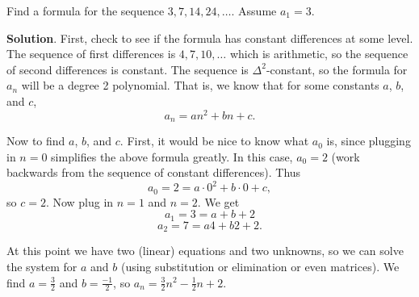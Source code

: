 \documentclass[11pt,]{book}
\theoremstyle{ptxplainnotitle}
\theoremstyle{ptxplaintitle}
\theoremstyle{ptxdefinitionnotitle}
\theoremstyle{ptxdefinitiontitle}
\theoremstyle{ptxdefinitionnotitle}
\theoremstyle{ptxdefinitiontitle}
\theoremstyle{ptxdefinitionnotitle}
\theoremstyle{ptxdefinitiontitle}
\theoremstyle{ptxdefinitiontitlenonumber}
\theoremstyle{ptxdefinitiontitlenonumber}
\numberwithin{equation}{chapter}
\begin{document}
\begin{example}\label{example-15}
\hypertarget{p-354}{}%
Find a formula for the sequence \(3, 7, 14, 24,\ldots\). Assume \(a_1 = 3\).%
\par\smallskip%
\noindent\textbf{Solution}.\hypertarget{solution-42}{}\quad%
\hypertarget{p-355}{}%
First, check to see if the formula has constant differences at some level. The sequence of first differences is \(4, 7, 10, \ldots\) which is arithmetic, so the sequence of second differences is constant. The sequence is \(\Delta^2\)-constant, so the formula for \(a_n\) will be a degree 2 polynomial. That is, we know that for some constants \(a\), \(b\), and \(c\),%
\begin{equation*}
a_n = an^2 + bn + c.
\end{equation*}
%
\par
\hypertarget{p-356}{}%
Now to find \(a\), \(b\), and \(c\). First, it would be nice to know what \(a_0\) is, since plugging in \(n = 0\) simplifies the above formula greatly. In this case, \(a_0 = 2\) (work backwards from the sequence of constant differences). Thus%
\begin{equation*}
a_0 = 2 = a\cdot 0^2 + b \cdot 0 + c,
\end{equation*}
so \(c = 2\). Now plug in \(n =1\) and \(n = 2\). We get%
\begin{equation*}
a_1 = 3 = a + b + 2
\end{equation*}
%
\begin{equation*}
a_2 = 7 = a4 + b 2 + 2.
\end{equation*}
%
\par
\hypertarget{p-357}{}%
At this point we have two (linear) equations and two unknowns, so we can solve the system for \(a\) and \(b\) (using substitution or elimination or even matrices). We find \(a = \frac{3}{2}\) and \(b = \frac{-1}{2}\), so \(a_n = \frac{3}{2} n^2 - \frac{1}{2}n + 2\).%
\end{example}
\end{document}

